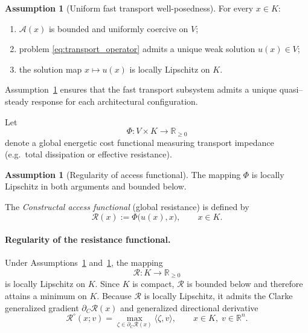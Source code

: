 \documentclass[12pt]{article}
\theoremstyle{plain}
\theoremstyle{definition}
\newtheorem{assumption}[theorem]{Assumption}
\theoremstyle{remark}
\begin{document}
\begin{assumption}[Uniform fast transport well-posedness]
\label{ass:fast_transport}
For every $x\in K$:
\begin{enumerate}[label=(\roman*),leftmargin=2.2em]
\item $\mathcal A(x)$ is bounded and uniformly coercive on $V$;
\item problem \eqref{eq:transport_operator} admits a unique weak solution $u(x)\in V$;
\item the solution map $x\mapsto u(x)$ is locally Lipschitz on $K$.
\end{enumerate}
\end{assumption}

Assumption~\ref{ass:fast_transport} ensures that the fast transport
subsystem admits a unique quasi–steady response for each architectural
configuration.

Let
\begin{equation}
\Phi:V\times K\rightarrow \mathbb{R}_{\ge0}
\label{eq:energetic_cost}
\end{equation}
denote a global energetic cost functional measuring transport impedance
(e.g.\ total dissipation or effective resistance).

\begin{assumption}[Regularity of access functional]
\label{ass:R_regular}
The mapping $\Phi$ is locally Lipschitz in both arguments and bounded
below.
\end{assumption}

The \emph{Constructal access functional} (global resistance) is defined by
\begin{equation}
\mathcal R(x) := \Phi\big(u(x),x\big),
\qquad x\in K .
\label{eq:access_functional}
\end{equation}

\paragraph{Regularity of the resistance functional.}
Under Assumptions~\ref{ass:fast_transport} and~\ref{ass:R_regular},
the mapping
\begin{equation}
\mathcal R:K\rightarrow\mathbb{R}_{\ge0}
\label{eq:R_mapping}
\end{equation}
is locally Lipschitz on $K$. Since $K$ is compact, $\mathcal R$ is
bounded below and therefore attains a minimum on $K$. Because $\mathcal R$ is locally Lipschitz, it admits the Clarke
generalized gradient $\partial_C\mathcal R(x)$ and generalized
directional derivative
\begin{equation}
\mathcal R^\circ(x;v)
=
\max_{\zeta\in\partial_C\mathcal R(x)}
\langle \zeta , v \rangle,
\qquad x\in K,\; v\in\mathbb R^n .
\label{eq:clarke_directional}
\end{equation}
\end{document}
